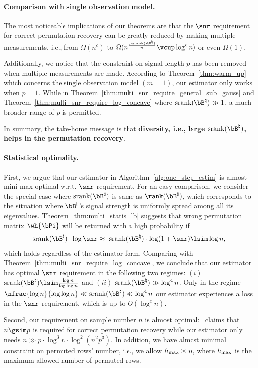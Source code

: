 \documentclass[11pt]{article}
\def \bBtrue {\bB^{\natural}}
\def\srank#1{\textup{srank}(#1)}
\begin{document}
\paragraph{Comparison with single observation model.}
The most noticeable implications of our theorems are
that the $\snr$ requirement for correct permutation recovery
can be greatly reduced by making multiple measurements, i.e., from $\Omega(n^{c})$ to
$\Omega(n^{\frac{c\cdot \srank{\bBtrue}}{n}}\vcup \log^c n)$ or even $\Omega(1)$.

Additionally, we notice that the constraint on signal length $p$ has been removed
when multiple measurements are made. According to Theorem~\ref{thm:warm_up} which
concerns the single observation model $(m = 1)$,
our estimator only works when $p = 1$.
While in Theorem~\ref{thm:multi_snr_require_general_sub_gauss} and Theorem~\ref{thm:multi_snr_require_log_concave} where $\srank{\bBtrue} \gg 1$,
a much broader range of $p$ is permitted.

In summary, the take-home message is that
\textbf{diversity, i.e., large $\srank{\bBtrue}$,
helps in the permutation recovery}.

\paragraph{Statistical optimality.}
First, we argue that our estimator in Algorithm~\ref{alg:one_step_estim} is almost
mini-max optimal w.r.t. $\snr$ requirement.
For an easy comparison, we consider
the special case where $\srank{\bBtrue}$
is same as $\rank(\bBtrue)$, which
corresponds to the situation where
$\bBtrue$'s signal strength is uniformly spread
among all its eigenvalues. Theorem~\ref{thm:multi_statis_lb}
suggests that wrong permutation matrix $\wh{\bPi}$
will be returned with a high probability if
\[
\srank{\bBtrue} \cdot  \log\snr  \approx \
\srank{\bBtrue} \cdot \log(1 + \snr)
\lsim \log n,
\]
which holds regardless of the estimator form.
Comparing with Theorem~\ref{thm:multi_snr_require_log_concave}, we conclude that
our estimator has optimal $\snr$ requirement in the following two
regimes: $(i)$ $\srank{\bBtrue} \lsim \frac{\log n}{\log\log n}$
and $(ii)$ $\srank{\bBtrue} \gg \log^4 n$. Only in the
regime $\nfrac{\log n}{\log \log n} \ll \srank{\bBtrue} \ll \log^4 n$
our estimator experiences a loss in the $\snr$ requirement, which is up to $O(\log^c n)$.

Second, our requirement on sample number $n$ is almost optimal:~\cite{unnikrishnan2015unlabeled} claims
that $n\gsim p$ is required for correct permutation recovery while our estimator
only needs $n\gg p\cdot \log^3 n \cdot \log^2(n^2p^3)$.
In addition, we have almost minimal constraint on permuted rows' number, i.e.,
we allow $h_{\textup{max}}\asymp n$, where
 $h_{\textup{max}}$ is the maximum
allowed number of permuted rows.
\end{document}
